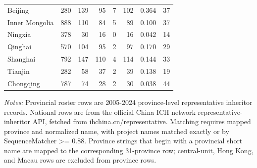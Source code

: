 \begin{table}[!htbp]
{\begin{tabular}{lrrrrrrr}
Beijing & 280 & 139 & 95 & 7 & 102 & 0.364 & 37 \\
Inner Mongolia & 888 & 110 & 84 & 5 & 89 & 0.100 & 37 \\
Ningxia & 378 & 30 & 16 & 0 & 16 & 0.042 & 14 \\
Qinghai & 570 & 104 & 95 & 2 & 97 & 0.170 & 29 \\
Shanghai & 792 & 147 & 110 & 4 & 114 & 0.144 & 33 \\
Tianjin & 282 & 58 & 37 & 2 & 39 & 0.138 & 19 \\
Chongqing & 787 & 74 & 28 & 2 & 30 & 0.038 & 44 \\
\bottomrule
\end{tabular}
}
\begin{minipage}{0.96\textwidth}
\footnotesize \textit{Notes:} Provincial roster rows are 2005-2024 province-level representative inheritor records. National rows are from the official China ICH network representative-inheritor API, fetched from ihchina.cn/representative. Matching requires mapped province and normalized name, with project names matched exactly or by SequenceMatcher >= 0.88. Province strings that begin with a provincial short name are mapped to the corresponding 31-province row; central-unit, Hong Kong, and Macau rows are excluded from province rows.
\end{minipage}
\end{table}
